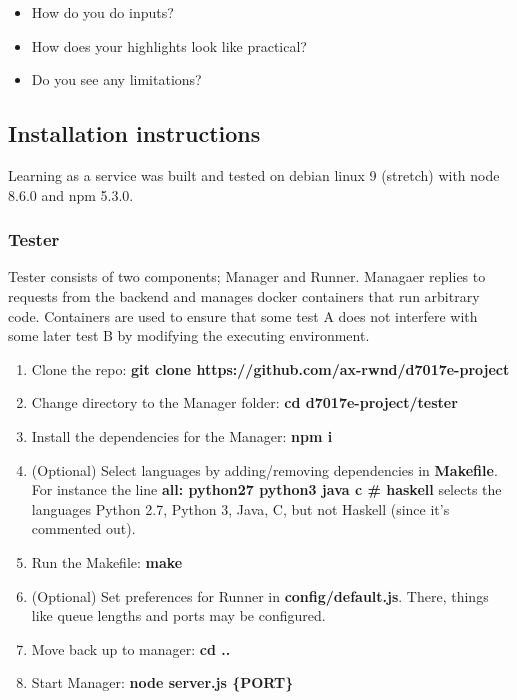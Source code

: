 \begin{itemize}
\item How do you do inputs?
\item How does your highlights look like practical?
\item Do you see any limitations?
\end{itemize} 

\subsection{Installation instructions}
Learning as a service was built and tested on debian linux 9 (stretch) with node 8.6.0 and npm 5.3.0.
\subsubsection{Tester}
Tester consists of two components; Manager and Runner. Managaer replies to requests from the backend and manages docker containers that run arbitrary code. Containers are used to ensure that some test A does not interfere with some later test B by modifying the executing environment.\\
\begin{enumerate}
    \item Clone the repo: \textbf{git clone https://github.com/ax-rwnd/d7017e-project}
    \item Change directory to the Manager folder: \textbf{cd d7017e-project/tester}
    \item Install the dependencies for the Manager: \textbf{npm i}
    \item (Optional) Select languages by adding/removing dependencies in \textbf{Makefile}. For instance the line\textbf{ all: python27 python3 java c \# haskell} selects the languages Python 2.7, Python 3, Java, C, but not Haskell (since it's commented out).
    \item Run the Makefile: \textbf{make}
    \item (Optional) Set preferences for Runner in \textbf{config/default.js}. There, things like queue lengths and ports may be configured.
    \item Move back up to manager: \textbf{cd ..}
    \item Start Manager: \textbf{node server.js \{PORT\}}
\end{enumerate}

